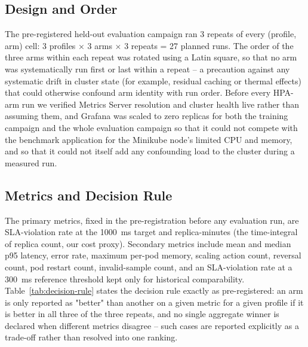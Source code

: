 \begin{table}[H]
\centering
\caption[Evaluation arms]{Evaluation arms.}
\label{tab:eval-arms}
\resizebox{\linewidth}{!}{}
\end{table}

\begin{table}[H]
\centering
\caption[Evaluation and stress profiles]{Traffic profiles used by the pre-registered held-out evaluation
and the exploratory stress test.}
\label{tab:eval-profiles}
\resizebox{\linewidth}{!}{}
\end{table}

\subsection{Design and Order}

The pre-registered held-out evaluation campaign ran 3 repeats of every
(profile, arm) cell: 3 profiles $\times$ 3 arms $\times$ 3 repeats = 27
planned runs. The order of the three arms within each repeat was rotated
using a Latin square, so that no arm was systematically run first or last
within a repeat -- a precaution against any systematic drift in cluster
state (for example, residual caching or thermal effects) that could
otherwise confound arm identity with run order. Before every HPA-arm run we
verified Metrics Server resolution and cluster health live rather than
assuming them, and Grafana was scaled to zero replicas for both the
training campaign and the whole evaluation campaign so that it could not
compete with the benchmark application for the Minikube node's limited CPU
and memory, and so that it could not itself add any confounding load to the
cluster during a measured run.

\subsection{Metrics and Decision Rule}

The primary metrics, fixed in the pre-registration before any evaluation
run, are SLA-violation rate at the 1000~ms target and replica-minutes (the
time-integral of replica count, our cost proxy). Secondary metrics include
mean and median p95 latency, error rate, maximum per-pod memory, scaling
action count, reversal count, pod restart count, invalid-sample count, and
an SLA-violation rate at a 300~ms reference threshold kept only for
historical comparability. Table~\ref{tab:decision-rule} states the
decision rule exactly as pre-registered: an arm is only reported as
"better" than another on a given metric for a given profile if it is
better in all three of the three repeats, and no single aggregate winner is
declared when different metrics disagree -- such cases are reported
explicitly as a trade-off rather than resolved into one ranking.

